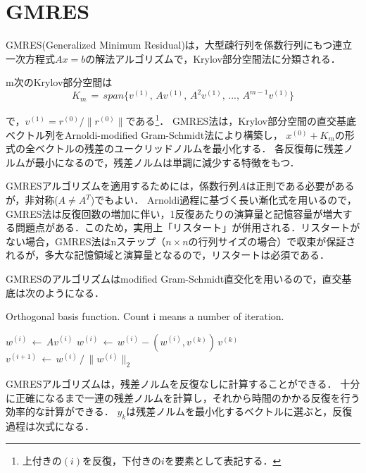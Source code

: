%
\section{GMRES}

GMRES(Generalized Minimum Residual)は，大型疎行列を係数行列にもつ連立一次方程式$A x = b$の解法アルゴリズムで，Krylov部分空間法に分類される．


m次のKrylov部分空間は
\begin{equation}
\displaystyle{ K_m \,=\, span \{ v^{(1)},\, Av^{(1)},\, A^2 v^{(1)},\, ...,\, A^{m-1} v^{(1)} \} }
\label{eq:subspace}
\end{equation}

\noindent で，$v^{(1)}=r^{(0)}/\|r^{(0)}\|$である\footnote{上付きの$(i)$を反復，下付きの$i$を要素として表記する．}．
GMRES法は，Krylov部分空間の直交基底ベクトル列をArnoldi-modified Gram-Schmidt法により構築し，
$x^{(0)}+K_m$の形式の全ベクトルの残差のユークリッドノルムを最小化する．
各反復毎に残差ノルムが最小になるので，残差ノルムは単調に減少する特徴をもつ．

GMRESアルゴリズムを適用するためには，係数行列$A$は正則である必要があるが，非対称($A \neq A^T$)でもよい．
Arnoldi過程に基づく長い漸化式を用いるので，GMRES法は反復回数の増加に伴い，1反復あたりの演算量と記憶容量が増大する問題点がある．このため，実用上「リスタート」が併用される．リスタートがない場合，GMRES法はnステップ（$n \times n$の行列サイズの場合）で収束が保証されるが，多大な記憶領域と演算量となるので，リスタートは必須である．

\vspace{3mm}
GMRESのアルゴリズムはmodified Gram-Schmidt直交化を用いるので，直交基底は次のようになる\cite{bahi:07}．

\begin{algorithm}
\caption{Orthogonal basis function. Count i means a number of iteration.}
\label{algo:GS-ortho}
\begin{algorithmic}

\State $w^{(i)} \,\gets \, A v^{(i)}$
\State $w^{(i)} \,\gets \, w^{(i)} - (w^{(i)}, v^{(k)})\, v^{(k)}$
\EndFor
\State $v^{(i+1)} \,\gets \, w^{(i)} \,/\, \|w^{(i)}\|_2$

\end{algorithmic}
\end{algorithm}


GMRESアルゴリズムは，残差ノルムを反復なしに計算することができる．
十分に正確になるまで一連の残差ノルムを計算し，それから時間のかかる反復を行う効率的な計算ができる．
$y_k$は残差ノルムを最小化するベクトルに選ぶと，反復過程は次式になる．

